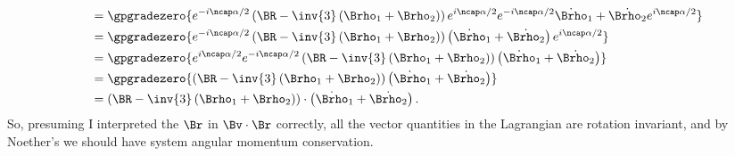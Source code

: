 {\begin{equation}
\begin{aligned}
&\quad=
\gpgradezero{
e^{-i\ncap \alpha/2} \left( \BR - \inv{3}\left(\Brho_1 + \Brho_2\right) \right) e^{i\ncap\alpha/2}
e^{-i\ncap \alpha/2} \dot{\Brho}_1 + \dot{\Brho_2} e^{i\ncap\alpha/2}
} \\
&\quad=
\gpgradezero{
e^{-i\ncap \alpha/2} \left( \BR - \inv{3}\left(\Brho_1 + \Brho_2\right) \right) \left(\dot{\Brho}_1 + \dot{\Brho_2}\right) e^{i\ncap\alpha/2}
} \\
&\quad=
\gpgradezero{
e^{i\ncap\alpha/2}
e^{-i\ncap \alpha/2} \left( \BR - \inv{3}\left(\Brho_1 + \Brho_2\right) \right) \left(\dot{\Brho}_1 + \dot{\Brho_2}\right)
} \\
&\quad=
\gpgradezero{
\left( \BR - \inv{3}\left(\Brho_1 + \Brho_2\right) \right) \left(\dot{\Brho}_1 + \dot{\Brho_2}\right)
} \\
&\quad=
\left( \BR - \inv{3}\left(\Brho_1 + \Brho_2\right) \right) \cdot \left(\dot{\Brho}_1 + \dot{\Brho_2}\right).
\end{aligned}
\end{equation}
%
So, presuming I interpreted the \(\Br\) in \(\Bv \cdot \Br\) correctly,
all the vector quantities in the Lagrangian are rotation invariant, and by Noether's we should have system angular momentum
conservation.
%
}
